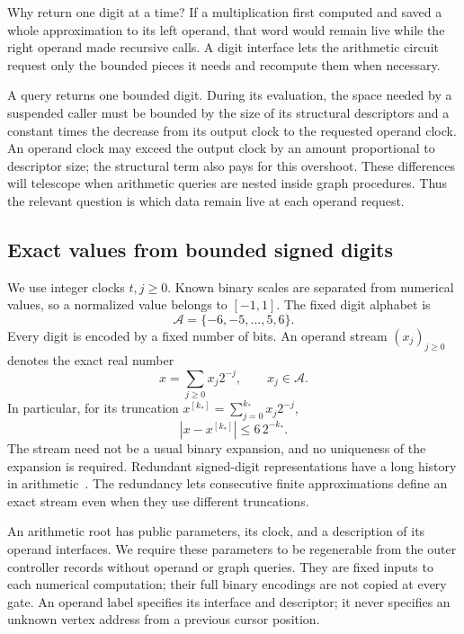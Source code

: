 \documentclass[11pt]{article}
\numberwithin{equation}{section}
\theoremstyle{definition}
\theoremstyle{remark}
\begin{document}
Why return one digit at a time? If a multiplication first computed and saved a whole approximation to its left operand, that word would remain live while the right operand made recursive calls. A digit interface lets the arithmetic circuit request only the bounded pieces it needs and recompute them when necessary.

A query returns one bounded digit.  During its evaluation, the space
needed by a suspended caller must be bounded by the size of its
structural descriptors and a constant times the decrease from its
output clock to the requested operand clock.  An operand clock may
exceed the output clock by an amount proportional to descriptor size;
the structural term also pays for this overshoot.  These differences
will telescope when arithmetic queries are nested inside graph procedures.
Thus the relevant question is which data remain live at each operand request.

\subsection{Exact values from bounded signed digits}

We use integer clocks $t,j\geq 0$.  Known binary scales are separated
from numerical values, so a normalized value belongs to $[-1,1]$.
The fixed digit alphabet is
\[
 \mathcal A=\{-6,-5,\ldots,5,6\}.
\]
Every digit is encoded by a fixed number of bits.  An operand stream
$(x_j)_{j\geq0}$ denotes the exact real number
\begin{equation}
 x=\sum_{j\geq0}x_j2^{-j},\qquad x_j\in\mathcal A.
 \label{eq:arith-stream}
\end{equation}
In particular, for its truncation $x^{[{k_*}]}=\sum_{j=0}^{k_*}x_j2^{-j}$,
\begin{equation}
 |x-x^{[{k_*}]}|\leq 6\,2^{-{k_*}}.
 \label{eq:arith-tail}
\end{equation}
The stream need not be a usual binary expansion, and no uniqueness
of the expansion is required.
Redundant signed-digit representations have a long history in
arithmetic~\cite{Avizienis1963}.  The redundancy lets consecutive
finite approximations define an exact stream even when they use
different truncations.

An arithmetic root has public parameters, its clock, and a description
of its operand interfaces.  We require these parameters to be
regenerable from the outer controller records without operand or graph
queries.  They are fixed inputs to each numerical computation; their
full binary encodings are not copied at every gate.  An operand label
specifies its interface and descriptor; it never specifies an unknown
vertex address from a previous cursor position.
\end{document}
